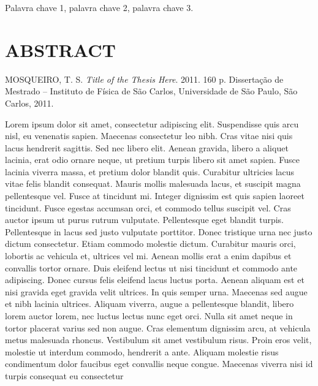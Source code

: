 \begin{palavraschave}
	Palavra chave 1, palavra chave 2, palavra chave 3.
\end{palavraschave}




\chapter*{ABSTRACT}

\begin{citacaotese}
  MOSQUEIRO, T. S. \textit{Title of the Thesis Here}. 2011. 160
  p. Disserta\c{c}\~ao de Mestrado -- Instituto de F\'isica de S\~ao
  Carlos, Universidade de S\~ao Paulo, S\~ao Carlos, 2011.
\end{citacaotese}
  
\begin{resumo}
  Lorem ipsum dolor sit amet, consectetur adipiscing elit. Suspendisse
  quis arcu nisl, eu venenatis sapien. Maecenas consectetur leo
  nibh. Cras vitae nisi quis lacus hendrerit sagittis. Sed nec libero
  elit. Aenean gravida, libero a aliquet lacinia, erat odio ornare
  neque, ut pretium turpis libero sit amet sapien. Fusce lacinia
  viverra massa, et pretium dolor blandit quis. Curabitur ultricies
  lacus vitae felis blandit consequat. Mauris mollis malesuada lacus,
  et suscipit magna pellentesque vel. Fusce at tincidunt mi. Integer
  dignissim est quis sapien laoreet tincidunt. Fusce egestas accumsan
  orci, et commodo tellus suscipit vel. Cras auctor ipsum ut purus
  rutrum vulputate. Pellentesque eget blandit turpis. Pellentesque in
  lacus sed justo vulputate porttitor. Donec tristique urna nec justo
  dictum consectetur. Etiam commodo molestie dictum. Curabitur mauris
  orci, lobortis ac vehicula et, ultrices vel mi. Aenean mollis erat a
  enim dapibus et convallis tortor ornare. Duis eleifend lectus ut
  nisi tincidunt et commodo ante adipiscing. Donec cursus felis
  eleifend lacus luctus porta. Aenean aliquam est et nisi gravida eget
  gravida velit ultrices. In quis semper urna. Maecenas sed augue et
  nibh lacinia ultrices. Aliquam viverra, augue a pellentesque
  blandit, libero lorem auctor lorem, nec luctus lectus nunc eget
  orci. Nulla sit amet neque in tortor placerat varius sed non
  augue. Cras elementum dignissim arcu, at vehicula metus malesuada
  rhoncus. Vestibulum sit amet vestibulum risus. Proin eros velit,
  molestie ut interdum commodo, hendrerit a ante. Aliquam molestie
  risus condimentum dolor faucibus eget convallis neque
  congue. Maecenas viverra nisi id turpis consequat eu consectetur

\end{resumo}
